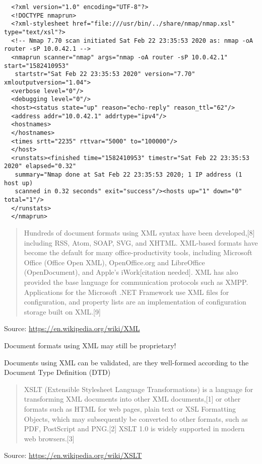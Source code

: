 \documentclass[Screen16to9,17pt]{foils}
\begin{document}

\begin{verbatim}
  <?xml version="1.0" encoding="UTF-8"?>
  <!DOCTYPE nmaprun>
  <?xml-stylesheet href="file:///usr/bin/../share/nmap/nmap.xsl" type="text/xsl"?>
  <!-- Nmap 7.70 scan initiated Sat Feb 22 23:35:53 2020 as: nmap -oA router -sP 10.0.42.1 -->
  <nmaprun scanner="nmap" args="nmap -oA router -sP 10.0.42.1" start="1582410953"
   startstr="Sat Feb 22 23:35:53 2020" version="7.70" xmloutputversion="1.04">
  <verbose level="0"/>
  <debugging level="0"/>
  <host><status state="up" reason="echo-reply" reason_ttl="62"/>
  <address addr="10.0.42.1" addrtype="ipv4"/>
  <hostnames>
  </hostnames>
  <times srtt="2235" rttvar="5000" to="100000"/>
  </host>
  <runstats><finished time="1582410953" timestr="Sat Feb 22 23:35:53 2020" elapsed="0.32"
   summary="Nmap done at Sat Feb 22 23:35:53 2020; 1 IP address (1 host up)
   scanned in 0.32 seconds" exit="success"/><hosts up="1" down="0" total="1"/>
  </runstats>
  </nmaprun>
\end{verbatim}



\begin{quote}
Hundreds of document formats using XML syntax have been developed,[8] including RSS, Atom, SOAP, SVG, and XHTML. XML-based formats have become the default for many office-productivity tools, including Microsoft Office (Office Open XML), OpenOffice.org and LibreOffice (OpenDocument), and Apple's iWork[citation needed]. XML has also provided the base language for communication protocols such as XMPP. Applications for the Microsoft .NET Framework use XML files for configuration, and property lists are an implementation of configuration storage built on XML.[9]
\end{quote}
Source: \url{https://en.wikipedia.org/wiki/XML}

\begin{list2}
\item Document formats using XML may still be proprietary!
\item Documents using XML can be validated, are they well-formed according to the Document Type Definition (DTD)
\end{list2}


\begin{quote}


XSLT (Extensible Stylesheet Language Transformations) is a language for transforming XML documents into other XML documents,[1] or other formats such as HTML for web pages, plain text or XSL Formatting Objects, which may subsequently be converted to other formats, such as PDF, PostScript and PNG.[2] XSLT 1.0 is widely supported in modern web browsers.[3]
\end{quote}
Source: \url{https://en.wikipedia.org/wiki/XSLT}
\end{document}
